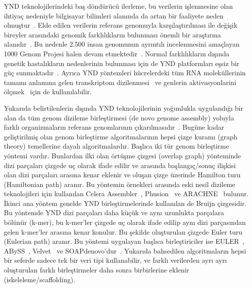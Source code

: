 \documentclass[11pt]{article}
\begin{document}
YND teknolojilerindeki baş döndürücü ilerleme, bu verilerin işlenmesine olan ihtiyaç nedeniyle bilgisayar bilimleri alanında da artan bir faaliyete neden olmuştur~\cite{Pop2008}. Elde edilen verilerin referans genomuyla karşılaştırılması ile değişik bireyler arasındaki genomik farklılıkların bulunması önemli bir araştırma alanıdır~\cite{Alkan2011,DePristo2011}. Bu nedenle 2.500 insan genomunun ayrıntılı incelenmesini amaçlayan 1000 Genom Projesi halen devam etmektedir~\cite{1000GP,1000GP2012}. Normal farklılıkların dışında genetik hastalıkların nedenlerinin bulunması için de YND platformları eşsiz bir güç sunmaktadır~\cite{Bamshad2011}. Ayrıca YND yöntemleri hücrelerdeki tüm RNA moleküllerinin tamamı anlamına gelen transkriptom dizilenmesi~\cite{Wang2009} ve genlerin aktivasyonlarini ölçmek~\cite{Park2009} için de kullanılabilir. 

Yukarıda belirtilenlerin dışında YND teknolojilerinin yoğunlukla uygulandığı bir alan da tüm genom dizileme birleştirmesi (de novo genome assembly) yoluyla farklı organizmaların referans genomlarının çıkarılmasıdır~\cite{Schatz2010}. Bugüne kadar geliştirilmiş olan genom birleştirme algoritmalarının hepsi çizge kuramı (graph theory) temellerine dayalı algoritmalardır. Başlıca iki tür genom birleştirme yöntemi vardır. Bunlardan ilki olan örtüşme çizgesi (overlap graph) yönteminde dizi parçaları çizgede uç olarak ifade edilir ve arasında başlangıç/sonuç ilişkisi olan dizi parçaları arasına kenar eklenir ve oluşan çizge üzerinde Hamilton turu (Hamiltonian path) aranır. Bu yöntemin örnekleri arasında eski nesil dizileme teknolojileri için kullanılan Celera Assembler~\cite{Myers2002}, Phusion~\cite{Mullikin2003} ve ARACHNE~\cite{Batzoglou2002} bulunur. İkinci ana yöntem genelde YND birleştirmelerinde kullanılan de Bruijn çizgesidir. Bu yöntemde YND dizi parçaları daha küçük ve aynı uzunlukta parçalara bölünür (k-mer), bu k-mer'ler çizgede uç olarak ifade edilip aynı dizi parçasından gelen k-mer'ler arasına kenar konulur. Bu şekilde oluşturulan çizgede Euler turu (Eulerian path) aranır. Bu yöntemi uygulayan başlıca birleştiriciler ise EULER~\cite{Chaisson2009}, ABySS~\cite{Simpson2009}, Velvet~\cite{Zerbino2008} ve SOAPdenovo'dur~\cite{Li2010b}. Yukarıda bahsedilen algoritmaların hepsi bir seferde sadece tek bir veri tipi kullanabilir, ve farklı verilerden ayrı ayrı oluşturulan farklı birleştirmeler daha sonra birbirlerine eklenir (iskeleleme/scaffolding).
\end{document}
